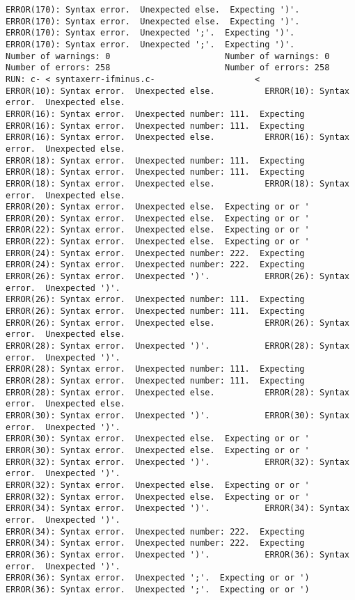 \documentclass[12pt]{book}
\begin{document}
\begin{lstlisting}
ERROR(170): Syntax error.  Unexpected else.  Expecting ')'.	ERROR(170): Syntax error.  Unexpected else.  Expecting ')'.
ERROR(170): Syntax error.  Unexpected ';'.  Expecting ')'.	ERROR(170): Syntax error.  Unexpected ';'.  Expecting ')'.
Number of warnings: 0						Number of warnings: 0
Number of errors: 258						Number of errors: 258
RUN: c- < syntaxerr-ifminus.c-				      <
ERROR(10): Syntax error.  Unexpected else.			ERROR(10): Syntax error.  Unexpected else.
ERROR(16): Syntax error.  Unexpected number: 111.  Expecting 	ERROR(16): Syntax error.  Unexpected number: 111.  Expecting 
ERROR(16): Syntax error.  Unexpected else.			ERROR(16): Syntax error.  Unexpected else.
ERROR(18): Syntax error.  Unexpected number: 111.  Expecting 	ERROR(18): Syntax error.  Unexpected number: 111.  Expecting 
ERROR(18): Syntax error.  Unexpected else.			ERROR(18): Syntax error.  Unexpected else.
ERROR(20): Syntax error.  Unexpected else.  Expecting or or '	ERROR(20): Syntax error.  Unexpected else.  Expecting or or '
ERROR(22): Syntax error.  Unexpected else.  Expecting or or '	ERROR(22): Syntax error.  Unexpected else.  Expecting or or '
ERROR(24): Syntax error.  Unexpected number: 222.  Expecting 	ERROR(24): Syntax error.  Unexpected number: 222.  Expecting 
ERROR(26): Syntax error.  Unexpected ')'.			ERROR(26): Syntax error.  Unexpected ')'.
ERROR(26): Syntax error.  Unexpected number: 111.  Expecting 	ERROR(26): Syntax error.  Unexpected number: 111.  Expecting 
ERROR(26): Syntax error.  Unexpected else.			ERROR(26): Syntax error.  Unexpected else.
ERROR(28): Syntax error.  Unexpected ')'.			ERROR(28): Syntax error.  Unexpected ')'.
ERROR(28): Syntax error.  Unexpected number: 111.  Expecting 	ERROR(28): Syntax error.  Unexpected number: 111.  Expecting 
ERROR(28): Syntax error.  Unexpected else.			ERROR(28): Syntax error.  Unexpected else.
ERROR(30): Syntax error.  Unexpected ')'.			ERROR(30): Syntax error.  Unexpected ')'.
ERROR(30): Syntax error.  Unexpected else.  Expecting or or '	ERROR(30): Syntax error.  Unexpected else.  Expecting or or '
ERROR(32): Syntax error.  Unexpected ')'.			ERROR(32): Syntax error.  Unexpected ')'.
ERROR(32): Syntax error.  Unexpected else.  Expecting or or '	ERROR(32): Syntax error.  Unexpected else.  Expecting or or '
ERROR(34): Syntax error.  Unexpected ')'.			ERROR(34): Syntax error.  Unexpected ')'.
ERROR(34): Syntax error.  Unexpected number: 222.  Expecting 	ERROR(34): Syntax error.  Unexpected number: 222.  Expecting 
ERROR(36): Syntax error.  Unexpected ')'.			ERROR(36): Syntax error.  Unexpected ')'.
ERROR(36): Syntax error.  Unexpected ';'.  Expecting or or ')	ERROR(36): Syntax error.  Unexpected ';'.  Expecting or or ')

\end{lstlisting}
\end{document}
